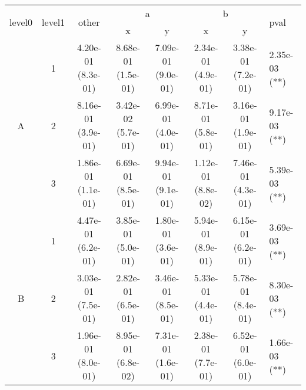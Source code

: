 \begin{tabular}{cccccccl}
\toprule
\multirow{2}{*}{level0} & \multirow{2}{*}{level1}& \multirow{2}{*}{other}&\multicolumn{2}{c}{a}&\multicolumn{2}{c}{b}& \multirow{2}{*}{pval}\tabularnewline
\cmidrule(lr){4-5}
\cmidrule(lr){6-7}
&&&x&y&x&y\tabularnewline
\midrule
\multirow{3}{*}{A}&1& 4.20e-01 (8.3e-01)& 8.68e-01 (1.5e-01)& 7.09e-01 (9.0e-01)& 2.34e-01 (4.9e-01)& 3.38e-01 (7.2e-01)& 2.35e-03 (**)\tabularnewline
&2& 8.16e-01 (3.9e-01)& 3.42e-02 (5.7e-01)& 6.99e-01 (4.0e-01)& 8.71e-01 (5.8e-01)& 3.16e-01 (1.9e-01)& 9.17e-03 (**)\tabularnewline
&3& 1.86e-01 (1.1e-01)& 6.69e-01 (8.5e-01)& 9.94e-01 (9.1e-01)& 1.12e-01 (8.8e-02)& 7.46e-01 (4.3e-01)& 5.39e-03 (**)\tabularnewline
\midrule
\multirow{3}{*}{B}&1& 4.47e-01 (6.2e-01)& 3.85e-01 (5.0e-01)& 1.80e-01 (3.6e-01)& 5.94e-01 (8.9e-01)& 6.15e-01 (6.2e-01)& 3.69e-03 (**)\tabularnewline
&2& 3.03e-01 (7.5e-01)& 2.82e-01 (6.5e-01)& 3.46e-01 (8.5e-01)& 5.33e-01 (4.4e-01)& 5.78e-01 (8.4e-01)& 8.30e-03 (**)\tabularnewline
&3& 1.96e-01 (8.0e-01)& 8.95e-01 (6.8e-02)& 7.31e-01 (1.6e-01)& 2.38e-01 (7.7e-01)& 6.52e-01 (6.0e-01)& 1.66e-03 (**)\tabularnewline
\bottomrule
\end{tabular}
